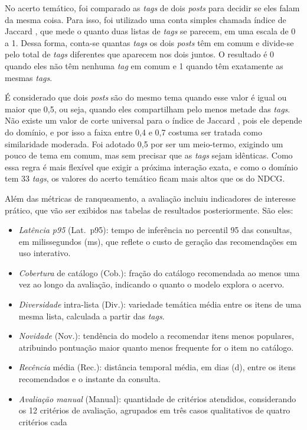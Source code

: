 \documentclass[a4paper,12pt]{article}
\begin{document}
{No acerto temático, foi comparado as \textit{tags} de dois \textit{posts} para decidir se eles falam da mesma coisa. Para isso, foi utilizado uma conta simples chamada índice de Jaccard \cite{Niwattanakul2013Jaccard}, que mede o quanto duas listas de \textit{tags} se parecem, em uma escala de 0 a 1. Dessa forma, conta-se quantas \textit{tags} os dois \textit{posts} têm em comum e divide-se pelo total de \textit{tags} diferentes que aparecem nos dois juntos. O resultado é 0 quando eles não têm nenhuma \textit{tag} em comum e 1 quando têm exatamente as mesmas \textit{tags}.

É considerado que dois \textit{posts} são do mesmo tema quando esse valor é igual ou maior que 0,5, ou seja, quando eles compartilham pelo menos metade das \textit{tags}. Não existe um valor de corte universal para o índice de Jaccard \cite{Niwattanakul2013Jaccard}, pois ele depende do domínio, e por isso a faixa entre 0,4 e 0,7 costuma ser tratada como similaridade moderada. Foi adotado 0,5 por ser um meio-termo, exigindo um pouco de tema em comum, mas sem precisar que as \textit{tags} sejam idênticas. Como essa regra é mais flexível que exigir a próxima interação exata, e como o domínio tem 33 \textit{tags}, os valores do acerto temático ficam mais altos que os do NDCG.


Além das métricas de ranqueamento, a avaliação incluiu indicadores de interesse prático, que vão ser exibidos nas tabelas de resultados posteriormente. São eles:



\begin{itemize}
    \item[a)] \textit{Latência p95} (Lat.\ p95): tempo de inferência no percentil 95 das consultas, em milissegundos (ms), que reflete o custo de geração das recomendações em uso interativo.
    \item[b)] \textit{Cobertura} de catálogo (Cob.): fração do catálogo recomendada ao menos uma vez ao longo da avaliação, indicando o quanto o modelo explora o acervo.
    \item[c)] \textit{Diversidade} intra-lista (Div.): variedade temática média entre os itens de uma mesma lista, calculada a partir das \textit{tags}.
    \item[d)] \textit{Novidade} (Nov.): tendência do modelo a recomendar itens menos populares, atribuindo pontuação maior quanto menos frequente for o item no catálogo.
    \item[e)] \textit{Recência} média (Rec.): distância temporal média, em dias (d), entre os itens recomendados e o instante da consulta.
    \item[f)] \textit{Avaliação manual} (Manual): quantidade de critérios atendidos, considerando os 12 critérios de avaliação, agrupados em três casos qualitativos de quatro critérios cada
\end{itemize}

}
\end{document}
